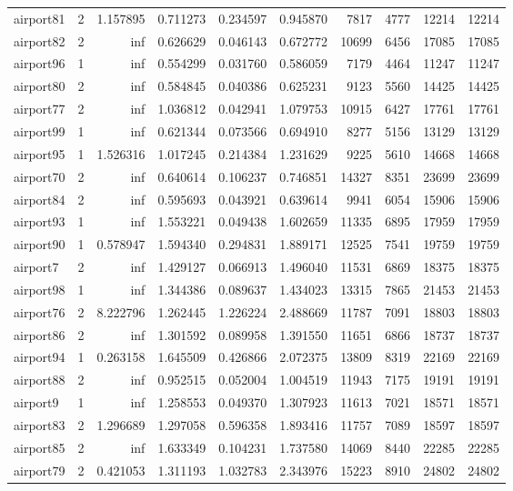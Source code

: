 \begin{longtable}{|l|r|r|r|r|r|r|r|r|r|}
airport81 & 2 & 1.157895 & 0.711273 & 0.234597 & 0.945870 & 7817 & 4777 & 12214 & 12214 \\
airport82 & 2 & inf & 0.626629 & 0.046143 & 0.672772 & 10699 & 6456 & 17085 & 17085 \\
airport96 & 1 & inf & 0.554299 & 0.031760 & 0.586059 & 7179 & 4464 & 11247 & 11247 \\
airport80 & 2 & inf & 0.584845 & 0.040386 & 0.625231 & 9123 & 5560 & 14425 & 14425 \\
airport77 & 2 & inf & 1.036812 & 0.042941 & 1.079753 & 10915 & 6427 & 17761 & 17761 \\
airport99 & 1 & inf & 0.621344 & 0.073566 & 0.694910 & 8277 & 5156 & 13129 & 13129 \\
airport95 & 1 & 1.526316 & 1.017245 & 0.214384 & 1.231629 & 9225 & 5610 & 14668 & 14668 \\
airport70 & 2 & inf & 0.640614 & 0.106237 & 0.746851 & 14327 & 8351 & 23699 & 23699 \\
airport84 & 2 & inf & 0.595693 & 0.043921 & 0.639614 & 9941 & 6054 & 15906 & 15906 \\
airport93 & 1 & inf & 1.553221 & 0.049438 & 1.602659 & 11335 & 6895 & 17959 & 17959 \\
airport90 & 1 & 0.578947 & 1.594340 & 0.294831 & 1.889171 & 12525 & 7541 & 19759 & 19759 \\
airport7 & 2 & inf & 1.429127 & 0.066913 & 1.496040 & 11531 & 6869 & 18375 & 18375 \\
airport98 & 1 & inf & 1.344386 & 0.089637 & 1.434023 & 13315 & 7865 & 21453 & 21453 \\
airport76 & 2 & 8.222796 & 1.262445 & 1.226224 & 2.488669 & 11787 & 7091 & 18803 & 18803 \\
airport86 & 2 & inf & 1.301592 & 0.089958 & 1.391550 & 11651 & 6866 & 18737 & 18737 \\
airport94 & 1 & 0.263158 & 1.645509 & 0.426866 & 2.072375 & 13809 & 8319 & 22169 & 22169 \\
airport88 & 2 & inf & 0.952515 & 0.052004 & 1.004519 & 11943 & 7175 & 19191 & 19191 \\
airport9 & 1 & inf & 1.258553 & 0.049370 & 1.307923 & 11613 & 7021 & 18571 & 18571 \\
airport83 & 2 & 1.296689 & 1.297058 & 0.596358 & 1.893416 & 11757 & 7089 & 18597 & 18597 \\
airport85 & 2 & inf & 1.633349 & 0.104231 & 1.737580 & 14069 & 8440 & 22285 & 22285 \\
airport79 & 2 & 0.421053 & 1.311193 & 1.032783 & 2.343976 & 15223 & 8910 & 24802 & 24802 \\

\end{longtable}
